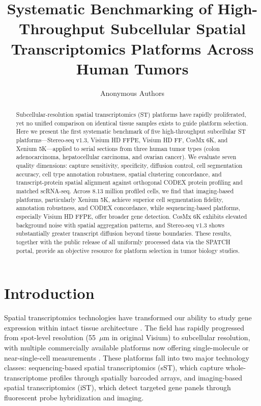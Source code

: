 \documentclass[11pt]{article}
\title{Systematic Benchmarking of High-Throughput Subcellular Spatial Transcriptomics Platforms Across Human Tumors}
\author{Anonymous Authors}
\date{}
\begin{document}
\maketitle

\begin{abstract}
Subcellular-resolution spatial transcriptomics (ST) platforms have rapidly proliferated, yet no unified comparison on identical tissue samples exists to guide platform selection. Here we present the first systematic benchmark of five high-throughput subcellular ST platforms---Stereo-seq v1.3, Visium HD FFPE, Visium HD FF, CosMx 6K, and Xenium 5K---applied to serial sections from three human tumor types (colon adenocarcinoma, hepatocellular carcinoma, and ovarian cancer). We evaluate seven quality dimensions: capture sensitivity, specificity, diffusion control, cell segmentation accuracy, cell type annotation robustness, spatial clustering concordance, and transcript-protein spatial alignment against orthogonal CODEX protein profiling and matched scRNA-seq. Across 8.13 million profiled cells, we find that imaging-based platforms, particularly Xenium 5K, achieve superior cell segmentation fidelity, annotation robustness, and CODEX concordance, while sequencing-based platforms, especially Visium HD FFPE, offer broader gene detection. CosMx 6K exhibits elevated background noise with spatial aggregation patterns, and Stereo-seq v1.3 shows substantially greater transcript diffusion beyond tissue boundaries. These results, together with the public release of all uniformly processed data via the SPATCH portal, provide an objective resource for platform selection in tumor biology studies.
\end{abstract}

\section{Introduction}

Spatial transcriptomics technologies have transformed our ability to study gene expression within intact tissue architecture \citep{stahl2016visualization, moses2022museum}. The field has rapidly progressed from spot-level resolution (55~$\mu$m in original Visium) to subcellular resolution, with multiple commercially available platforms now offering single-molecule or near-single-cell measurements \citep{williams2022introduction}. These platforms fall into two major technology classes: sequencing-based spatial transcriptomics (sST), which capture whole-transcriptome profiles through spatially barcoded arrays, and imaging-based spatial transcriptomics (iST), which detect targeted gene panels through fluorescent probe hybridization and imaging.
\end{document}
